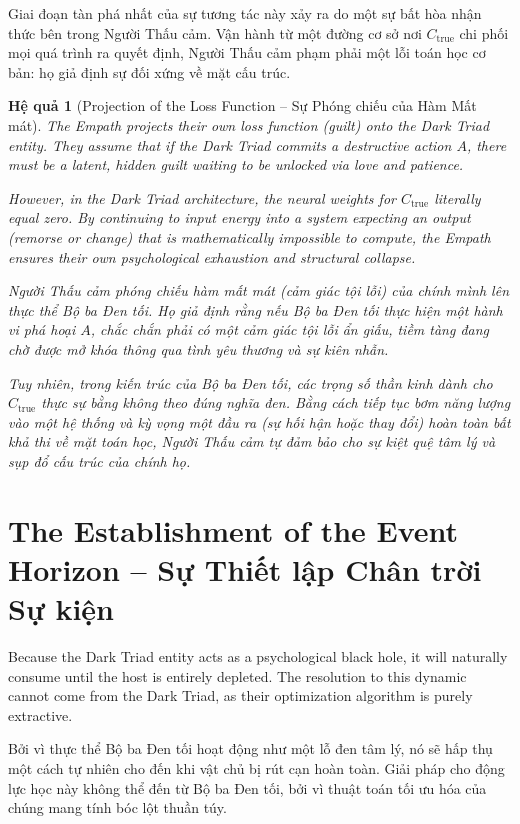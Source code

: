 \documentclass{report}
\newtheorem{hequa}{Hệ quả}
\begin{document}
Giai đoạn tàn phá nhất của sự tương tác này xảy ra do một sự bất hòa nhận thức bên trong Người Thấu cảm. Vận hành từ một đường cơ sở nơi $C_{\text{true}}$ chi phối mọi quá trình ra quyết định, Người Thấu cảm phạm phải một lỗi toán học cơ bản: họ giả định sự đối xứng về mặt cấu trúc.

\begin{hequa}[Projection of the Loss Function -- Sự Phóng chiếu của Hàm Mất mát]
	The Empath projects their own loss function (guilt) onto the Dark Triad entity. They assume that if the Dark Triad commits a destructive action $A$, there must be a latent, hidden guilt waiting to be unlocked via love and patience. 
	
	However, in the Dark Triad architecture, the neural weights for $C_{\text{true}}$ literally equal zero. By continuing to input energy into a system expecting an output (remorse or change) that is mathematically impossible to compute, the Empath ensures their own psychological exhaustion and structural collapse.
	
	Người Thấu cảm phóng chiếu hàm mất mát (cảm giác tội lỗi) của chính mình lên thực thể Bộ ba Đen tối. Họ giả định rằng nếu Bộ ba Đen tối thực hiện một hành vi phá hoại $A$, chắc chắn phải có một cảm giác tội lỗi ẩn giấu, tiềm tàng đang chờ được mở khóa thông qua tình yêu thương và sự kiên nhẫn.
	
	Tuy nhiên, trong kiến trúc của Bộ ba Đen tối, các trọng số thần kinh dành cho $C_{\text{true}}$ thực sự bằng không theo đúng nghĩa đen. Bằng cách tiếp tục bơm năng lượng vào một hệ thống và kỳ vọng một đầu ra (sự hối hận hoặc thay đổi) hoàn toàn bất khả thi về mặt toán học, Người Thấu cảm tự đảm bảo cho sự kiệt quệ tâm lý và sụp đổ cấu trúc của chính họ.
\end{hequa}

\section{The Establishment of the Event Horizon -- Sự Thiết lập Chân trời Sự kiện}

Because the Dark Triad entity acts as a psychological black hole, it will naturally consume until the host is entirely depleted. The resolution to this dynamic cannot come from the Dark Triad, as their optimization algorithm is purely extractive. 

Bởi vì thực thể Bộ ba Đen tối hoạt động như một lỗ đen tâm lý, nó sẽ hấp thụ một cách tự nhiên cho đến khi vật chủ bị rút cạn hoàn toàn. Giải pháp cho động lực học này không thể đến từ Bộ ba Đen tối, bởi vì thuật toán tối ưu hóa của chúng mang tính bóc lột thuần túy.
\end{document}
